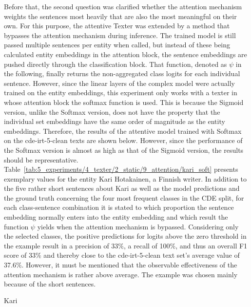 Before that, the second question was clarified whether the attention mechanism weights the sentences most heavily that are also the most meaningful on their own. For this purpose, the attentive Texter was extended by a method that bypasses the attention mechanism during inference. The trained model is still passed multiple sentences per entity when called, but instead of these being calculated entity embeddings in the attention block, the sentence embeddings are pushed directly through the classification block. That function, denoted as $\psi$ in the following, finally returns the non-aggregated class logits for each individual sentence. However, since the linear layers of the complex model were actually trained on the entity embeddings, this experiment only works with a texter in whose attention block the softmax function is used. This is because the Sigmoid version, unlike the Softmax version, does not have the property that the individual set embeddings have the same order of magnitude as the entity embeddings. Therefore, the results of the attentive model trained with Softmax on the cde-irt-5-clean texts are shown below. However, since the performance of the Softmax version is almost as high as that of the Sigmoid version, the results should be representative. Table~\ref{tab:5_experiments/4_texter/2_static/9_attention/kari_soft} presents exemplary values for the entity Kari Hotakainen, a Finnish writer. In addition to the five rather short sentences about Kari as well as the model predictions and the ground truth concerning the four most frequent classes in the CDE split, for each class-sentence combination it is stated to which proportion the sentence embedding normally enters into the entity embedding and which result the function $\psi$ yields when the attention mechanism is bypassed. Considering only the selected classes, the positive predictions for logits above the zero threshold in the example result in a precision of 33\%, a recall of 100\%, and thus an overall F1 score of 33\% and thereby close to the cde-irt-5-clean text set's average value of 37.6\%. However, it must be mentioned that the observable effectiveness of the attention mechanism is rather above average. The example was chosen mainly because of the short sentences.

\begin{table}[h]
    \centering
    
    \caption{Kari}
    \label{tab:5_experiments/4_texter/2_static/9_attention/kari_soft}
\end{table}

